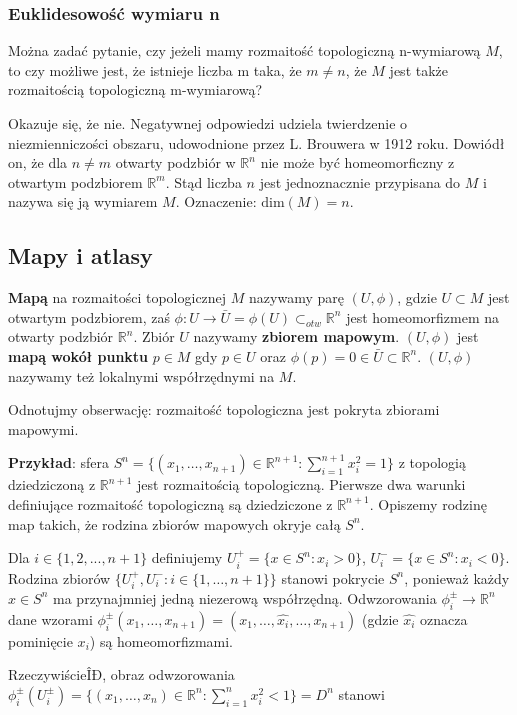 \subsubsection{Euklidesowość wymiaru n}
Można zadać pytanie, czy jeżeli mamy rozmaitość topologiczną n-wymiarową $M$, to czy możliwe jest, że istnieje liczba m taka, że $m \neq n$, że $M$ jest także rozmaitością topologiczną m-wymiarową?

Okazuje się, że nie. Negatywnej odpowiedzi udziela twierdzenie o niezmienniczości obszaru, udowodnione przez L. Brouwera w 1912 roku. Dowiódł on, że dla $n \neq m$ otwarty podzbiór w $\mathbb{R}^n$ nie może być homeomorficzny z otwartym podzbiorem $\mathbb{R}^m$. Stąd liczba $n$ jest jednoznacznie przypisana do $M$ i nazywa się ją wymiarem $M$. Oznaczenie: $\mathrm{dim}(M) = n$.

\subsection{Mapy i atlasy}
\begin{definition}
	\textbf{Mapą} na rozmaitości topologicznej $M$ nazywamy parę $(U,\phi)$, gdzie $U \subset M$ jest otwartym podzbiorem, zaś $\phi : U \to \bar{U} = \phi(U) \subset_{otw} \mathbb{R}^n$ jest homeomorfizmem na otwarty podzbiór $\mathbb{R}^n$. Zbiór $U$ nazywamy \textbf{zbiorem mapowym}. $(U, \phi)$ jest \textbf{mapą wokół punktu} $p \in M$ gdy $p \in U$ oraz $\phi(p) = 0 \in \bar{U} \subset \mathbb{R}^n$. $(U,\phi)$ nazywamy też lokalnymi współrzędnymi na $M$.
\end{definition}

Odnotujmy obserwację: rozmaitość topologiczna jest pokryta zbiorami mapowymi.

\textbf{Przykład}: sfera $S^n = \{(x_1, \dots, x_{n+1}) \in \mathbb{R}^{n+1} : \sum_{i=1}^{n+1} x_i^2=1\}$ z topologią dziedziczoną z $\mathbb{R}^{n+1}$ jest rozmaitością topologiczną. Pierwsze dwa warunki definiujące rozmaitość topologiczną są dziedziczone z $\mathbb{R}^{n+1}$. Opiszemy rodzinę map takich, że rodzina zbiorów mapowych okryje całą $S^n$.

Dla $i \in \{1, 2, ..., n+1\}$ definiujemy $U_i^+ = \{x \in S^n : x_i > 0\}$, $U_i^- = \{x \in S^n : x_i < 0\}$. Rodzina zbiorów $\{U_i^+, U_i^- : i \in \{1, \dots, n+1\}\}$ stanowi pokrycie $S^n$, ponieważ każdy $x \in S^n$ ma przynajmniej jedną niezerową współrzędną. Odwzorowania $\phi_i^{\pm} \to \mathbb{R}^n$ dane wzorami $\phi_i^{\pm}(x_1, \dots, x_{n+1}) = (x_1, \dots, \hat{x_i}, \dots, x_{n+1})$ (gdzie $\hat{x_i}$ oznacza pominięcie $x_i$) są homeomorfizmami.

RzeczywiścieÎÐ, obraz odwzorowania $\phi_i^{\pm}(U_i^{\pm}) = \{(x_1, \dots, x_n) \in \mathbb{R}^n : \sum_{i=1}^{n} x_i^2 < 1\} = D^n$ stanowi 
